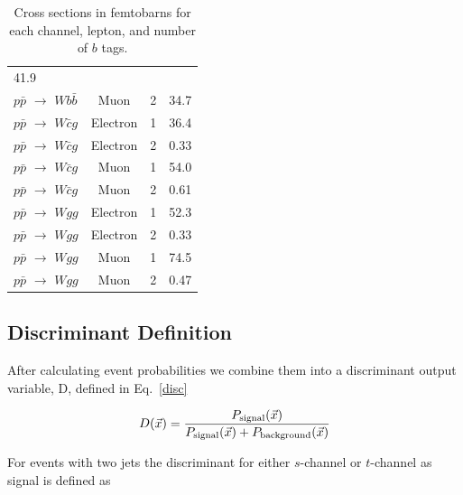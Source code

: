 \begin{table}[!h!tbp]
\begin{center}
\begin{minipage}{4.5 in}
\begin{ruledtabular}
\begin{tabular}{l||ccc}
	41.9			\\
$p\bar{p}$ $\rightarrow$ $Wb\bar{b}$	&	Muon	&	2	&
	34.7			\\
\hline
\hline
$p\bar{p}$ $\rightarrow$ $W\bar{c}g$	&	Electron	&	1	&
	36.4			\\
$p\bar{p}$ $\rightarrow$ $W\bar{c}g$	&	Electron	&	2	&
	0.33			\\
$p\bar{p}$ $\rightarrow$ $W\bar{c}g$	&	Muon	&	1	&
	54.0			\\
$p\bar{p}$ $\rightarrow$ $W\bar{c}g$	&	Muon	&	2	&
	0.61			\\
\hline
$p\bar{p}$ $\rightarrow$ $Wgg$		&	Electron	&	1	&
	52.3			\\
$p\bar{p}$ $\rightarrow$ $Wgg$		&	Electron	&	2	&
	0.33			\\
$p\bar{p}$ $\rightarrow$ $Wgg$		&	Muon	&	1	&
	74.5			\\
$p\bar{p}$ $\rightarrow$ $Wgg$		&	Muon	&	2	&
	0.47			\\
\hline
\end{tabular}
\end{ruledtabular}
\vspace{-0.1 in}
\caption[obs_me]{Cross sections in femtobarns for each channel, lepton, and number of $b$ tags.}
\label{crosssections}
\end{minipage}
\end{center}
\end{table}

\clearpage
\subsection{Discriminant Definition}

After calculating event probabilities we combine them into a discriminant output variable, D, defined in Eq.~\ref{disc}

\begin{equation}
\label{disc}
D(\vec{x}) = \frac{P_{\rm{signal}}(\vec{x})}{P_{\rm{signal}}(\vec{x}) + P_{\rm{background}}(\vec{x})}
\end{equation}

\noindent For events with two jets the discriminant for either $s$-channel or $t$-channel as signal is defined as

